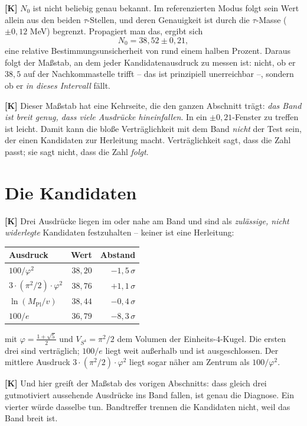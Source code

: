 \textbf{[K]} $N_0$ ist nicht beliebig genau bekannt. Im referenzierten Modus
folgt sein Wert allein aus den beiden $\tau$-Stellen, und deren Genauigkeit ist
durch die $\tau$-Masse ($\pm 0{,}12$ MeV) begrenzt. Propagiert man das, ergibt
sich
\[
  N_0 = 38{,}52 \pm 0{,}21 ,
\]
eine relative Bestimmungsunsicherheit von rund einem halben Prozent. Daraus
folgt der Maßstab, an dem jeder Kandidatenausdruck zu messen ist: nicht, ob er
$38{,}5$ auf der Nachkommastelle trifft -- das ist prinzipiell unerreichbar --,
sondern ob er \emph{in dieses Intervall} fällt.

\textbf{[K]} Dieser Maßstab hat eine Kehrseite, die den ganzen Abschnitt trägt:
\emph{das Band ist breit genug, dass viele Ausdrücke hineinfallen}. In ein
$\pm 0{,}21$-Fenster zu treffen ist leicht. Damit kann die bloße Verträglichkeit
mit dem Band \emph{nicht} der Test sein, der einen Kandidaten zur Herleitung
macht. Verträglichkeit sagt, dass die Zahl passt; sie sagt nicht, dass die Zahl
\emph{folgt}.

\section{Die Kandidaten}

\textbf{[K]} Drei Ausdrücke liegen im oder nahe am Band und sind als
\emph{zulässige, nicht widerlegte} Kandidaten festzuhalten -- keiner ist eine
Herleitung:

\begin{center}
\begin{tabular}{lrr}
\hline
Ausdruck & Wert & Abstand \\
\hline
$100/\varphi^2$                 & $38{,}20$ & $-1{,}5\,\sigma$ \\
$3\cdot(\pi^2/2)\cdot\varphi^2$ & $38{,}76$ & $+1{,}1\,\sigma$ \\
$\ln(M_\text{Pl}/v)$            & $38{,}44$ & $-0{,}4\,\sigma$ \\
\hline
$100/e$                         & $36{,}79$ & $-8{,}3\,\sigma$ \\
\hline
\end{tabular}
\end{center}

mit $\varphi = \tfrac{1+\sqrt5}{2}$ und $V_{S^4} = \pi^2/2$ dem Volumen der
Einheits-$4$-Kugel. Die ersten drei sind verträglich; $100/e$ liegt weit
außerhalb und ist ausgeschlossen. Der mittlere Ausdruck
$3 \cdot (\pi^2/2) \cdot \varphi^2$ liegt sogar näher am Zentrum als
$100/\varphi^2$.

\textbf{[K]} Und hier greift der Maßstab des vorigen Abschnitts: dass gleich drei
gutmotiviert aussehende Ausdrücke ins Band fallen, ist genau die Diagnose. Ein
vierter würde dasselbe tun. Bandtreffer trennen die Kandidaten nicht, weil das
Band breit ist.

